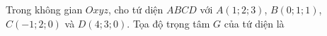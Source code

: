 \begin{ex}
Trong không gian $Oxyz$, cho tứ diện $ABCD$ với $A(1;2;3)$, $B(0;1;1)$, $C(-1;2;0)$ và $D(4;3;0)$. Tọa độ trọng tâm $G$ của tứ diện là
\end{ex}
